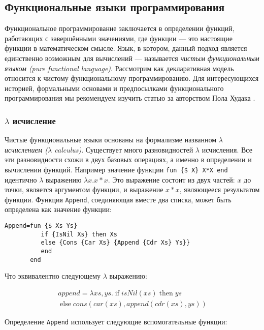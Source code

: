 \subsection{Функциональные языки программирования}\label{subsection:functional_programming_languages}

Функциональное программирование заключается в определении функций, работающих с завершёнными значениями, где функции --- это настоящие функции в математическом смысле. Язык, в котором, данный подход является единственно возможным для вычислений --- называется \emph{чистым функциональным языком (pure functional language)}. Рассмотрим как декларативная модель относится к чистому функциональному программированию. Для интересующихся историей, формальными основами и предпосылками функционального программирования мы рекомендуем изучить статью за авторством Пола Худака \cite{85}.

\subsubsection{$\lambda$ исчисление}

Чистые функциональные языки основаны на формализме названном \emph{$\lambda$ исчислением ($\lambda$ calculus)}. Существует много разновидностей $\lambda$ исчисления. Все эти разновидности схожи в двух базовых операциях, а именно в определении и вычислении функций. Например значение функции \lstinline[mathescape=false]!fun {$ X} X*X end! идентично $\lambda$ выражению $\lambda x. x * x$. Это выражение состоит из двух частей: $x$ до точки, является аргументом функции, и выражение $x*x$, являющееся результатом функции. Функция \lstinline!Append!, соединяющая вместе два списка, может быть определена как значение функции:

\begin{lstlisting}[mathescape=false]
Append=fun {$ Xs Ys}
          if {IsNil Xs} then Xs
          else {Cons {Car Xs} {Append {Cdr Xs} Ys}}
          end
       end
\end{lstlisting}

Что эквивалентно следующему $\lambda$ выражению:

\begin{multline*}
append = \lambda xs, ys. \; \text{if} \; isNil(xs) \; \text{then} \; ys \\
\; \text{else} \; cons(car(xs), append(cdr(xs), ys))
\end{multline*}

Определение \lstinline!Append! использует следующие вспомогательные функции:

